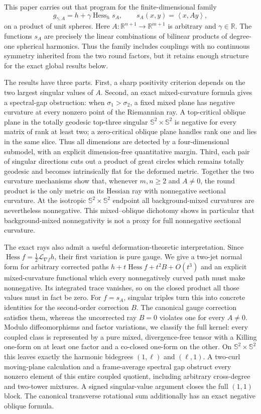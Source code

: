 \documentclass[11pt]{amsart}
\theoremstyle{definition}
\theoremstyle{remark}
\DeclareMathOperator{\Hess}{Hess}
\newcommand{\R}{\mathbb R}
\newcommand{\Sph}{\mathbb S}
\newcommand{\ip}[2]{\left\langle #1,#2\right\rangle}
\begin{document}
This paper carries out that program for the finite-dimensional family
\begin{equation}\label{eq:family-intro}
 g_{\gamma,A}=h+\gamma\Hess_h s_A,
 \qquad s_A(x,y)=\ip{x}{Ay},
\end{equation}
on a product of unit spheres.  Here
$A:\R^{n+1}\to\R^{m+1}$ is arbitrary and $\gamma\in\R$.  The functions
$s_A$ are precisely the linear combinations of bilinear products of
degree-one spherical harmonics.  Thus the family includes couplings with
no continuous symmetry inherited from the two round factors, but it
retains enough structure for the exact global results below.

The results have three parts.  First, a sharp positivity criterion
depends on the two largest singular values of $A$.  Second, an exact
mixed-curvature formula gives a spectral-gap obstruction: when
$\sigma_1>\sigma_2$, a fixed mixed plane has negative curvature at
every nonzero point of the Riemannian ray.  A top-critical oblique
plane in the totally geodesic top-three singular
$\Sph^2\times\Sph^2$ is negative for every matrix of rank at least
two; a zero-critical oblique plane handles rank one and lies in the
same slice.  Thus all dimensions are detected by a four-dimensional
submodel, with an explicit dimension-free quantitative margin.
Third, each pair of
singular directions cuts out a product of great circles which remains
totally geodesic and becomes intrinsically flat for the deformed
metric.  Together the two curvature mechanisms show that, whenever
$m,n\geq2$ and $A\neq0$, the round product is the only metric on its
Hessian ray with nonnegative sectional curvature.  At the isotropic
$\Sph^2\times\Sph^2$ endpoint all background-mixed
curvatures are nevertheless nonnegative.  This mixed--oblique
dichotomy shows in particular that background-mixed nonnegativity is
not a proxy for full nonnegative sectional curvature.

The exact rays also admit a useful deformation-theoretic
interpretation.  Since
$\Hess f=\frac12\mathcal L_{\nabla f}h$, their first variation is
pure gauge.  We give a two-jet normal form for arbitrary corrected
paths $h+t\Hess f+t^2B+O(t^3)$ and an explicit mixed-curvature
functional which every nonnegatively curved path must make
nonnegative.  Its integrated trace vanishes, so on the closed product
all those values must in fact be zero.  For $f=s_A$, singular triples
turn this into concrete identities for the second-order correction
$B$.  The canonical gauge correction satisfies them, whereas the
uncorrected ray $B=0$ violates one for every $A\neq0$.
Modulo diffeomorphisms and factor variations, we classify the full
kernel: every coupled class is represented by a pure mixed,
divergence-free tensor with a Killing one-form on at least one factor
and a co-closed one-form on the other.  On $\Sph^2\times\Sph^2$ this
leaves exactly the harmonic bidegrees $(1,\ell)$ and $(\ell,1)$.  A
two-curl moving-plane calculation and a frame-average spectral gap
obstruct every nonzero element of this entire coupled quotient,
including arbitrary cross-degree and two-tower mixtures.  A signed
singular-value argument closes the full $(1,1)$ block.  The canonical
transverse rotational sum additionally has an exact negative oblique
formula.
\end{document}
